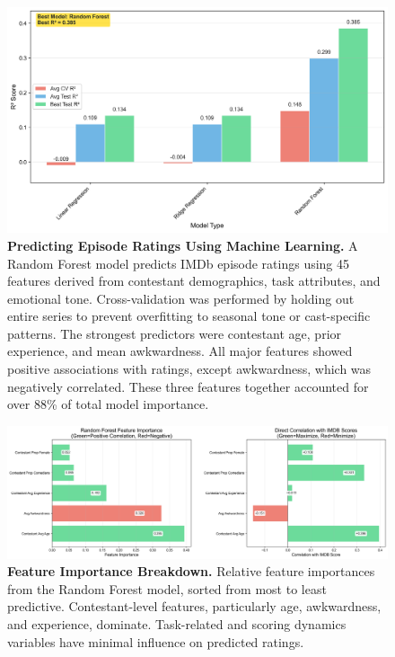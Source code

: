 \documentclass[10pt,letterpaper]{article}
\begin{document}
\begin{figure}[!h]
\centering
\includegraphics[width=\linewidth]{figures/main/Fig10.png}
\caption{{\bf Predicting Episode Ratings Using Machine Learning.}
A Random Forest model predicts IMDb episode ratings using 45 features derived from contestant demographics, task attributes, and emotional tone. Cross-validation was performed by holding out entire series to prevent overfitting to seasonal tone or cast-specific patterns. The strongest predictors were contestant age, prior experience, and mean awkwardness. All major features showed positive associations with ratings, except awkwardness, which was negatively correlated. These three features together accounted for over 88\% of total model importance.}
\label{fig:ml_prediction}
\end{figure}
\FloatBarrier

\begin{figure}[!h]
\centering
\includegraphics[width=\linewidth]{figures/main/Fig11.png}
\caption{{\bf Feature Importance Breakdown.}
Relative feature importances from the Random Forest model, sorted from most to least predictive. Contestant-level features, particularly age, awkwardness, and experience, dominate. Task-related and scoring dynamics variables have minimal influence on predicted ratings.}
\label{fig:feature_importance}
\end{figure}
\FloatBarrier
\end{document}
